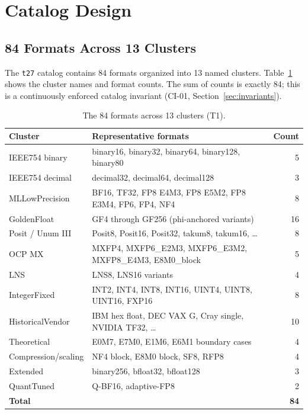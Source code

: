 \documentclass[11pt,letterpaper]{article}
\begin{document}
\section{Catalog Design}
\label{sec:catalog}

\subsection{84 Formats Across 13 Clusters}

The \texttt{t27} catalog contains 84 formats organized into 13 named clusters.
Table~\ref{tab:clusters} shows the cluster names and format counts.  The sum
of counts is exactly 84; this is a continuously enforced catalog invariant
(CI-01, Section~\ref{sec:invariants}).

\begin{table}[ht]
\centering
\small
\caption{The 84 formats across 13 clusters (T1).}
\label{tab:clusters}
\begin{tabularx}{\linewidth}{l X r}
\toprule
\textbf{Cluster} & \textbf{Representative formats} & \textbf{Count} \\
\midrule
IEEE754 binary       & binary16, binary32, binary64, binary128, binary80          & 5  \\
IEEE754 decimal      & decimal32, decimal64, decimal128                            & 3  \\
MLLowPrecision       & BF16, TF32, FP8 E4M3, FP8 E5M2, FP8 E3M4, FP6, FP4, NF4     & 8  \\
GoldenFloat          & GF4 through GF256 (phi-anchored variants)                   & 16 \\
Posit / Unum III     & Posit8, Posit16, Posit32, takum8, takum16, \ldots           & 8  \\
OCP MX               & MXFP4, MXFP6\_E2M3, MXFP6\_E3M2, MXFP8\_E4M3, E8M0\_block   & 5  \\
LNS                  & LNS8, LNS16 variants                                         & 4  \\
IntegerFixed         & INT2, INT4, INT8, INT16, UINT4, UINT8, UINT16, FXP16        & 8  \\
HistoricalVendor     & IBM hex float, DEC VAX G, Cray single, NVIDIA TF32, \ldots  & 10 \\
Theoretical          & E0M7, E7M0, E1M6, E6M1 boundary cases                       & 4  \\
Compression/scaling  & NF4 block, E8M0 block, SF8, RFP8                            & 4  \\
Extended             & binary256, bfloat32, bfloat128                              & 3  \\
QuantTuned           & Q-BF16, adaptive-FP8                                         & 2  \\
\midrule
\textbf{Total}       &                                                              & \textbf{84} \\
\bottomrule
\end{tabularx}
\end{table}
\end{document}
